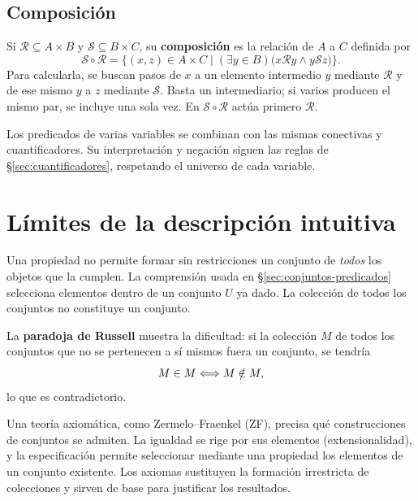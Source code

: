 \subsection*{Composición}

Si $\mathcal R\subseteq A\times B$ y $\mathcal S\subseteq B\times C$,
su \textbf{composición} es la relación de $A$ a $C$ definida por
\[
 \mathcal S\circ\mathcal R
 =\{(x,z)\in A\times C\mid
       (\exists y\in B)\bigl(x\mathcal R y\wedge y\mathcal S z\bigr)\}.
\]
Para calcularla, se buscan pasos de $x$ a un elemento intermedio $y$
mediante $\mathcal R$ y de ese mismo $y$ a $z$ mediante $\mathcal S$.
Basta un intermediario; si varios producen el mismo par, se incluye
una sola vez. En $\mathcal S\circ\mathcal R$ actúa primero
$\mathcal R$.

Los predicados de varias variables se combinan con las mismas
conectivas y cuantificadores. Su interpretación y negación siguen las
reglas de \S\ref{sec:cuantificadores}, respetando el universo de cada variable.

\section{Límites de la descripción intuitiva}

Una propiedad no permite formar sin restricciones un conjunto de
\emph{todos} los objetos que la cumplen. La comprensión usada en
\S\ref{sec:conjuntos-predicados} selecciona elementos dentro de un
conjunto $U$ ya dado. La colección de todos los conjuntos no constituye
un conjunto.

La \textbf{paradoja de Russell} muestra la dificultad: si la colección
$M$ de todos los conjuntos que no se pertenecen a sí mismos fuera un
conjunto, se tendría
\[
 M\in M\Longleftrightarrow M\notin M,
\]
lo que es contradictorio.

Una teoría axiomática, como Zermelo--Fraenkel (ZF), precisa qué
construcciones de conjuntos se admiten. La igualdad se rige por sus
elementos (extensionalidad), y la especificación permite seleccionar
mediante una propiedad los elementos de un conjunto existente.
Los axiomas sustituyen la formación irrestricta de colecciones y
sirven de base para justificar los resultados.
